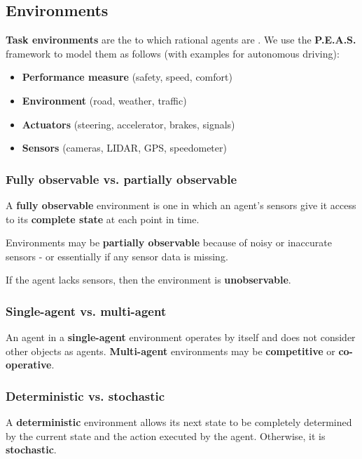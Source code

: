 \subsection{Environments}

\textbf{Task environments} are the  to which rational agents are . We use the \textbf{P.E.A.S.} framework to model them as follows (with examples for autonomous driving):

\begin{itemize}
    \item \textbf{Performance measure} (safety, speed, comfort)
    \item \textbf{Environment} (road, weather, traffic)
    \item \textbf{Actuators} (steering, accelerator, brakes, signals)
    \item \textbf{Sensors} (cameras, LIDAR, GPS, speedometer)
\end{itemize}


\subsubsection{Fully observable vs. partially observable}

A \textbf{fully observable} environment is one in which an agent's sensors give it access to its \textbf{complete state} at each point in time.

Environments may be \textbf{partially observable} because of noisy or inaccurate sensors - or essentially if any sensor data is missing.

If the agent lacks sensors, then the environment is \textbf{unobservable}.


\subsubsection{Single-agent vs. multi-agent}

An agent in a \textbf{single-agent} environment operates by itself and does not consider other objects as agents. \textbf{Multi-agent} environments may be \textbf{competitive} or \textbf{co-operative}.


\subsubsection{Deterministic vs. stochastic}

A \textbf{deterministic} environment allows its next state to be completely determined by the current state and the action executed by the agent. Otherwise, it is \textbf{stochastic}.

